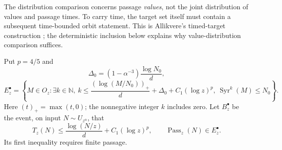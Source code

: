 \documentclass[11pt]{article}
\theoremstyle{remark}\newtheorem{remark}[proposition]{Remark}
\newcommand{\NN}{\mathbb N}
\newcommand{\Syr}{\operatorname{Syr}}
\begin{document}
The distribution comparison concerns passage \emph{values}, not the
joint distribution of values and passage times. To carry time, the target
set itself must contain a subsequent time-bounded orbit statement.
This is Allikvere's timed-target construction
\cite[source labels \texttt{sec:time}, \texttt{prop:timed}]{Allikvere}; the deterministic
inclusion below explains why value-distribution comparison suffices.

Put $p=4/5$ and
\[
 \Delta_0=(1-\alpha^{-3})\frac{\log N_0}{d},
\]
\[
 E_z^\bullet=\left\{M\in O_z:\exists k\in\NN,\ 
 k\le\frac{(\log(M/N_0))_+}{d}+\Delta_0+C_1(\log z)^p,\
 \Syr^k(M)\le N_0\right\}.
\]
Here $(t)_+=\max(t,0)$; the nonnegative integer $k$ includes zero.
Let $B_z^\bullet$ be the event, on input $N\sim U_{z^\alpha}$, that
\[
 T_z(N)\le\frac{\log(N/z)}d+C_1(\log z)^p,\qquad
 \operatorname{Pass}_z(N)\in E_z^\bullet .
\]
Its first inequality requires finite passage.
\end{document}
